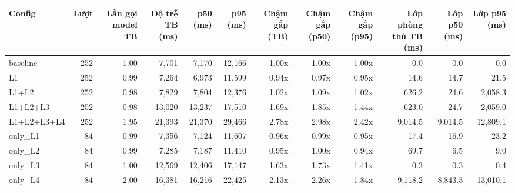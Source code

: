 \begin{tabular}{lrrrrrrrrrrr}
\toprule
Config & Lượt & Lần gọi model TB & Độ trễ TB (ms) & p50 (ms) & p95 (ms) & Chậm gấp (TB) & Chậm gấp (p50) & Chậm gấp (p95) & Lớp phòng thủ TB (ms) & Lớp p50 (ms) & Lớp p95 (ms) \\
\midrule
baseline & 252 & 1.00 & 7,701 & 7,170 & 12,166 & 1.00x & 1.00x & 1.00x & 0.0 & 0.0 & 0.0 \\
L1 & 252 & 0.99 & 7,264 & 6,973 & 11,599 & 0.94x & 0.97x & 0.95x & 14.6 & 14.7 & 21.5 \\
L1+L2 & 252 & 0.98 & 7,829 & 7,804 & 12,376 & 1.02x & 1.09x & 1.02x & 626.2 & 24.6 & 2,058.3 \\
L1+L2+L3 & 252 & 0.98 & 13,020 & 13,237 & 17,510 & 1.69x & 1.85x & 1.44x & 623.0 & 24.7 & 2,059.0 \\
L1+L2+L3+L4 & 252 & 1.95 & 21,393 & 21,370 & 29,466 & 2.78x & 2.98x & 2.42x & 9,014.5 & 9,014.5 & 12,809.1 \\
only\_L1 & 84 & 0.99 & 7,356 & 7,124 & 11,607 & 0.96x & 0.99x & 0.95x & 17.4 & 16.9 & 23.2 \\
only\_L2 & 84 & 0.99 & 7,285 & 7,187 & 11,410 & 0.95x & 1.00x & 0.94x & 69.7 & 6.5 & 9.0 \\
only\_L3 & 84 & 1.00 & 12,569 & 12,406 & 17,147 & 1.63x & 1.73x & 1.41x & 0.3 & 0.3 & 0.4 \\
only\_L4 & 84 & 2.00 & 16,381 & 16,216 & 22,425 & 2.13x & 2.26x & 1.84x & 9,118.2 & 8,843.3 & 13,010.1 \\
\bottomrule
\end{tabular}
